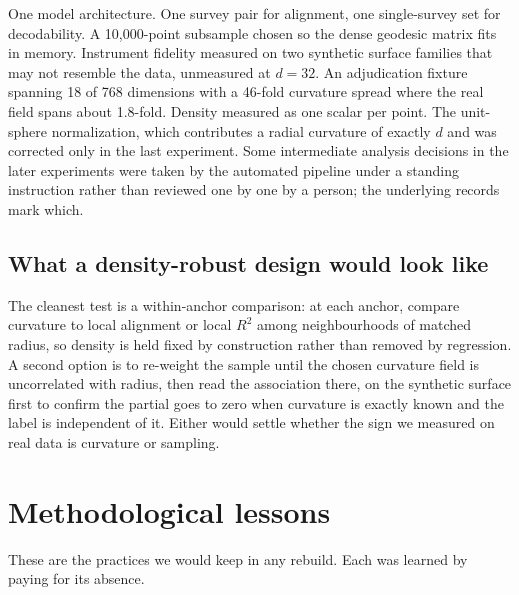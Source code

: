 \documentclass[11pt,a4paper]{article}
\begin{document}
One model architecture. One survey pair for alignment, one single-survey set for decodability. A 10{,}000-point subsample chosen so the dense geodesic matrix fits in memory. Instrument fidelity measured on two synthetic surface families that may not resemble the data, unmeasured at $d = 32$. An adjudication fixture spanning 18 of 768 dimensions with a 46-fold curvature spread where the real field spans about 1.8-fold. Density measured as one scalar per point. The unit-sphere normalization, which contributes a radial curvature of exactly $d$ and was corrected only in the last experiment. Some intermediate analysis decisions in the later experiments were taken by the automated pipeline under a standing instruction rather than reviewed one by one by a person; the underlying records mark which.

\subsection{What a density-robust design would look like}

The cleanest test is a within-anchor comparison: at each anchor, compare curvature to local alignment or local $R^2$ among neighbourhoods of matched radius, so density is held fixed by construction rather than removed by regression. A second option is to re-weight the sample until the chosen curvature field is uncorrelated with radius, then read the association there, on the synthetic surface first to confirm the partial goes to zero when curvature is exactly known and the label is independent of it. Either would settle whether the sign we measured on real data is curvature or sampling.

\section{Methodological lessons}

These are the practices we would keep in any rebuild. Each was learned by paying for its absence.
\end{document}
